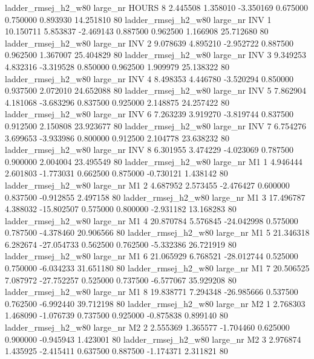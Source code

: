 ladder_rmsej_h2_w80   large_nr    HOURS                 8  2.445508  1.358010  -3.350169 0.675000 0.750000  0.893930   14.251810 80
ladder_rmsej_h2_w80   large_nr      INV                 1 10.150711  5.853837  -2.469143 0.887500 0.962500  1.166908   25.712680 80
ladder_rmsej_h2_w80   large_nr      INV                 2  9.078639  4.895210  -2.952722 0.887500 0.962500  1.367007   25.404829 80
ladder_rmsej_h2_w80   large_nr      INV                 3  9.349253  4.832316  -3.319528 0.850000 0.962500  1.909979   25.138322 80
ladder_rmsej_h2_w80   large_nr      INV                 4  8.498353  4.446780  -3.520294 0.850000 0.937500  2.072010   24.652088 80
ladder_rmsej_h2_w80   large_nr      INV                 5  7.862904  4.181068  -3.683296 0.837500 0.925000  2.148875   24.257422 80
ladder_rmsej_h2_w80   large_nr      INV                 6  7.263239  3.919270  -3.819744 0.837500 0.912500  2.150808   23.923677 80
ladder_rmsej_h2_w80   large_nr      INV                 7  6.754276  3.699653  -3.933986 0.800000 0.912500  2.104778   23.638232 80
ladder_rmsej_h2_w80   large_nr      INV                 8  6.301955  3.474229  -4.023069 0.787500 0.900000  2.004004   23.495549 80
ladder_rmsej_h2_w80   large_nr       M1                 1  4.946444  2.601803  -1.773031 0.662500 0.875000 -0.730121    1.438142 80
ladder_rmsej_h2_w80   large_nr       M1                 2  4.687952  2.573455  -2.476427 0.600000 0.837500 -0.912855    2.497158 80
ladder_rmsej_h2_w80   large_nr       M1                 3 17.496787  4.388032 -15.802507 0.575000 0.800000 -2.931182   13.168283 80
ladder_rmsej_h2_w80   large_nr       M1                 4 20.870784  5.576845 -24.042998 0.575000 0.787500 -4.378460   20.906566 80
ladder_rmsej_h2_w80   large_nr       M1                 5 21.346318  6.282674 -27.054733 0.562500 0.762500 -5.332386   26.721919 80
ladder_rmsej_h2_w80   large_nr       M1                 6 21.065929  6.768521 -28.012744 0.525000 0.750000 -6.034233   31.651180 80
ladder_rmsej_h2_w80   large_nr       M1                 7 20.506525  7.087972 -27.752257 0.525000 0.737500 -6.577067   35.929208 80
ladder_rmsej_h2_w80   large_nr       M1                 8 19.838771  7.294348 -26.985666 0.537500 0.762500 -6.992440   39.712198 80
ladder_rmsej_h2_w80   large_nr       M2                 1  2.768303  1.468090  -1.076739 0.737500 0.925000 -0.875838    0.899140 80
ladder_rmsej_h2_w80   large_nr       M2                 2  2.555369  1.365577  -1.704460 0.625000 0.900000 -0.945943    1.423001 80
ladder_rmsej_h2_w80   large_nr       M2                 3  2.976874  1.435925  -2.415411 0.637500 0.887500 -1.174371    2.311821 80
